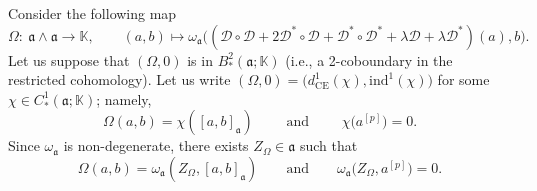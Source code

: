 \documentclass[10pt,a4paper]{amsart}
\numberwithin{equation}{section}
\begin{document}
Consider the following map
\[
\Omega\colon\ \mathfrak{a}\wedge \mathfrak{a} \rightarrow \mathbb{K}, \qquad (a,b) \mapsto \omega_\mathfrak{a} \bigl( ({\mathscr D} \circ {\mathscr D}+ 2 {\mathscr D}^* \circ {\mathscr D}+ {\mathscr D}^* \circ {\mathscr D}^* +\lambda {\mathscr D} + \lambda {\mathscr D} ^* )(a) , b \bigr).
\]
Let us suppose that $(\Omega, 0)$ is in $B^2_*(\mathfrak{a};\mathbb{K})$ (i.e., a 2-coboundary in the restricted cohomology). Let us write $(\Omega, 0)= \bigl(d^1_{\mathrm{CE}} (\chi), \mathrm{ind}^1(\chi) \bigr)$ for some $\chi\in C^1_*(\mathfrak{a}; \mathbb{K})$; namely,
\[
\Omega(a,b)=\chi([a,b]_\mathfrak{a}) \qquad \text{ and } \qquad \chi\bigl(a^{[p]}\bigr)=0.
\]
Since $\omega_\mathfrak{a}$ is non-degenerate, there exists $Z_\Omega\in \mathfrak{a}$ such that
\begin{equation*}%
\Omega(a,b)=\omega_\mathfrak{a}(Z_\Omega,[a,b]_\mathfrak{a})\qquad \text{and} \qquad \omega_\mathfrak{a}\bigl(Z_\Omega,a^{[p]}\bigr)=0.
\end{equation*}
\end{document}
